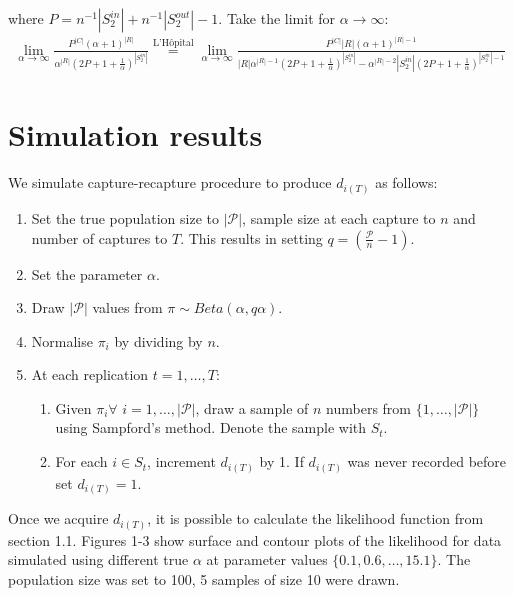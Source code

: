 \documentclass[a4paper, 12pt]{article}
\newcommand{\sout}[1][T]{|S^{out}_{#1}|}
\newcommand{\sint}[1][T]{|S^{in}_{#1}|}
\begin{document}
where $P = n^{-1} \sint[2] + n^{-1} \sout[2] - 1$. Take the limit for $\alpha \to \infty$:
\begin{align*}
\lim_{\alpha \to \infty} \frac{P^{|C|}(\alpha + 1)^{|R|}}{\alpha^{|R|} (2P + 1 + \frac{1}{\alpha})^{\sint[2]}} \overset{\text{L'Hôpital}}{=} \lim_{\alpha \to \infty} \frac{P^{|C|}|R|(\alpha + 1)^{|R| - 1}}{|R|\alpha^{|R|-1} (2P + 1 + \frac{1}{\alpha})^{\sint[2]} - \alpha^{|R|-2} \sint[2] (2P + 1 + \frac{1}{\alpha})^{\sint[2] - 1}}
\end{align*}
\section{Simulation results}
We simulate capture-recapture procedure to produce $d_{i(T)}$ as follows:
\begin{enumerate}
    \item Set the true population size to $|\mathcal{P}|$, sample size at each capture to $n$ and number of captures to $T$. This results in setting $q = (\frac{\mathcal{P}}{n} - 1)$. 
    \item Set the parameter $\alpha$.
    \item Draw $|\mathcal{P}|$ values from $\pi \sim Beta(\alpha, q\alpha)$.
    \item Normalise $\pi_i$ by dividing by $n$.
    \item At each replication $t = 1,\dots,T$:
        \begin{enumerate}
            \item Given $\pi_i \forall$ $i = 1,\dots,|\mathcal{P}|$, draw a sample of $n$ numbers from $\{1,\dots,|\mathcal{P}|\}$ using Sampford's method. Denote the sample with $S_t$.
            \item For each $i \in S_t$, increment $d_{i(T)}$ by 1. If $d_{i(T)}$ was never recorded before set $d_{i(T)} = 1$.
        \end{enumerate}
\end{enumerate}
Once we acquire $d_{i(T)}$, it is possible to calculate the likelihood function from section 1.1. Figures 1-3 show surface and contour plots of the likelihood for data simulated using different true $\alpha$ at parameter values $\{0.1, 0.6, \dots, 15.1\}$. The population size was set to 100, 5 samples of size 10 were drawn.
\end{document}
